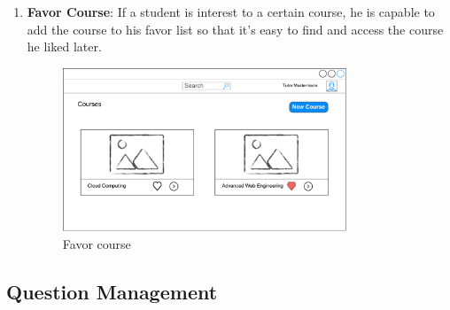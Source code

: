 \begin{enumerate}
\item
\textbf{Favor Course}: If a student is interest to a certain course, he is capable to add the course to his favor list so that it's easy to find and access the course he liked later.

\begin{figure}[!htbp]
  \centering
    \includegraphics[width=0.8\textwidth]{Figures/mockup/Favour-Course.pdf}
  \caption{Favor course}
\end{figure}

\end{enumerate}

\subsection{Question Management}

